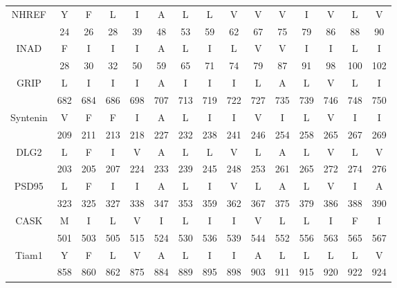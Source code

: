 \documentclass[a4paper,12pt]{article}
\begin{document}
    \clearpage


           \begin{tabular}{ccccccccccccccc}
         
         \toprule
         
         \cmidrule{1-15}
         
          
         NHREF & Y & F & L & I & A & L & L & V & V & V & I & V & L & V \\
         & 24 & 26 & 28 & 39 & 48 & 53 & 59 & 62 & 67 & 75 & 79 & 86 & 88 & 90 \\ 
         INAD & F & I & I & I & A & L & I & L & V & V & I & I & L & I \\ 
         & 28 & 30 & 32 & 50 & 59 & 65 & 71 & 74 & 79 & 87 & 91 & 98 & 100 & 102 \\ 
         GRIP & L & I & I & I & A & I & I & I & L & A & L & V & L & I \\
         & 682 & 684 & 686 & 698 & 707 & 713 & 719 & 722 & 727 & 735 & 739 & 746 & 748 & 750 \\ 
         Syntenin & V & F & F & I & A & L & I & I & V & I & L & V & I & I \\ 
         & 209 & 211 & 213 & 218 & 227 & 232 & 238 & 241 & 246 & 254 & 258 & 265 & 267 & 269 \\ 
         DLG2 & L & F & I & V & A & L & L & V & L & A & L & V & L & V \\ 
         & 203 & 205 & 207 & 224 & 233 & 239 & 245 & 248 & 253 & 261 & 265 & 272 & 274 & 276 \\ 
         PSD95 & L & F & I & I & A & L & I & V & L & A & L & V & I & A \\ 
         & 323 & 325 & 327 & 338 & 347 & 353 & 359 & 362 & 367 & 375 & 379 & 386 & 388 & 390 \\ 
         CASK & M & I & L & V & I & L & I & I & V & L & L & I & F & I \\ 
         & 501 & 503 & 505 & 515 & 524 & 530 & 536 & 539 & 544 & 552 & 556 & 563 & 565 & 567 \\ 
         Tiam1 & Y & F & L & V & A & L & I & I & A & L & L & L & L & V \\ 
         & 858 & 860 & 862 & 875 & 884 & 889 & 895 & 898 & 903 & 911 & 915 & 920 & 922 & 924 \\
         
         \bottomrule
         
       \end{tabular}

   
\thispagestyle{empty}
\end{document}
